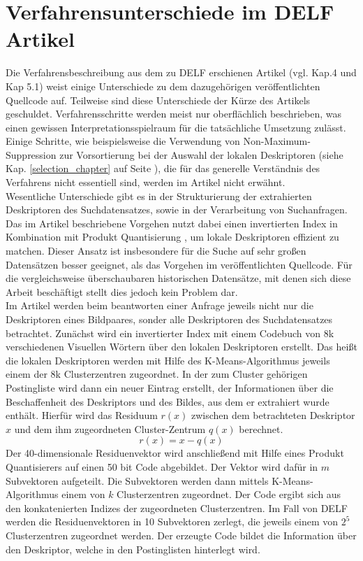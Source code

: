 \section{Verfahrensunterschiede im DELF Artikel}\label{pipeline_changes}
Die Verfahrensbeschreibung aus dem zu DELF erschienen Artikel (vgl. \cite{delf} Kap.4 und Kap 5.1) weist einige Unterschiede zu dem dazugehörigen veröffentlichten Quellcode auf. Teilweise sind diese Unterschiede der Kürze des Artikels geschuldet. Verfahrensschritte werden meist nur oberflächlich beschrieben, was einen gewissen Interpretationsspielraum für die tatsächliche Umsetzung zulässt. Einige Schritte, wie beispielsweise die Verwendung von  Non-Maximum-Suppression zur Vorsortierung bei der Auswahl der lokalen Deskriptoren (siehe Kap. \ref{selection_chapter} auf Seite \pageref{selection_chapter}), die für das generelle Verständnis des Verfahrens nicht essentiell sind, werden im Artikel nicht erwähnt.
\\
Wesentliche Unterschiede gibt es in der Strukturierung der extrahierten Deskriptoren des Suchdatensatzes, sowie in der Verarbeitung von Suchanfragen. Das im Artikel beschriebene Vorgehen nutzt dabei einen invertierten Index in Kombination mit Produkt Quantisierung \cite{pq}, um lokale Deskriptoren effizient zu matchen. Dieser Ansatz ist insbesondere für die Suche auf sehr großen Datensätzen besser geeignet, als das Vorgehen im veröffentlichten Quellcode. Für die vergleichsweise überschaubaren historischen Datensätze, mit denen sich diese Arbeit beschäftigt stellt dies jedoch kein Problem dar. 
\\
Im Artikel werden beim beantworten einer Anfrage jeweils nicht nur die Deskriptoren eines Bildpaares, sonder alle Deskriptoren des Suchdatensatzes betrachtet. Zunächst wird ein invertierter Index mit einem Codebuch von 8k verschiedenen Visuellen Wörtern über den lokalen Deskriptoren erstellt. Das heißt die lokalen Deskriptoren werden mit Hilfe des K-Means-Algorithmus\cite{k_means} jeweils einem der 8k Clusterzentren zugeordnet. In der zum Cluster gehörigen Postingliste wird dann ein neuer Eintrag erstellt, der Informationen über die Beschaffenheit des Deskriptors und des Bildes, aus dem er extrahiert wurde enthält. Hierfür wird das Residuum $r(x)$ zwischen dem betrachteten Deskriptor $x$ und dem ihm zugeordneten Cluster-Zentrum $q(x)$ berechnet.
\begin{equation}
r(x) = x - q(x)
\end{equation}
Der 40-dimensionale Residuenvektor wird anschließend mit Hilfe eines Produkt Quantisierers auf einen 50 bit Code abgebildet. Der Vektor wird dafür in $m$ Subvektoren aufgeteilt. Die Subvektoren werden dann mittels K-Means-Algorithmus einem von $k$ Clusterzentren zugeordnet. Der Code ergibt sich aus den konkatenierten Indizes der zugeordneten Clusterzentren. Im Fall von DELF werden die Residuenvektoren in 10 Subvektoren zerlegt, die jeweils einem von $2^5$ Clusterzentren zugeordnet werden. Der erzeugte Code bildet die Information über den Deskriptor, welche in den Postinglisten hinterlegt wird.
